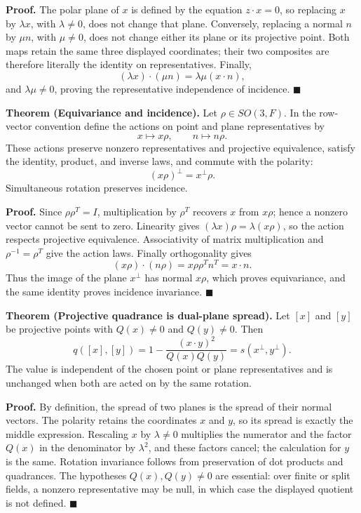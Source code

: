 \documentclass[11pt]{article}
\begin{document}
\smallskip
\noindent\textbf{Proof.}
The polar plane of \(x\) is defined by the equation
\(z\mathbin{\cdot}x=0\), so replacing \(x\) by
\(\lambda x\), with \(\lambda\ne0\), does not change that plane.
Conversely, replacing a normal \(n\) by \(\mu n\), with \(\mu\ne0\), does
not change either its plane or its projective point.  Both maps retain the
same three displayed coordinates; their two composites are therefore
literally the identity on representatives.  Finally,
\[
 (\lambda x)\mathbin{\cdot}(\mu n)
   =\lambda\mu(x\mathbin{\cdot}n),
\]
and \(\lambda\mu\ne0\), proving the representative independence of
incidence. \hfill\(\blacksquare\)

\medskip
\noindent\textbf{Theorem (Equivariance and incidence).}
Let \(\rho\in SO(3,F)\).  In the row-vector convention define the actions on
point and plane representatives by
\[
 x\longmapsto x\rho,\qquad n\longmapsto n\rho.
\]
These actions preserve nonzero representatives and projective equivalence,
satisfy the identity, product, and inverse laws, and commute with the
polarity:
\[
 (x\rho)^\perp=x^\perp\rho.
\]
Simultaneous rotation preserves incidence.

\smallskip
\noindent\textbf{Proof.}
Since \(\rho\rho^T=I\), multiplication by \(\rho^T\) recovers \(x\) from
\(x\rho\); hence a nonzero vector cannot be sent to zero.  Linearity gives
\((\lambda x)\rho=\lambda(x\rho)\), so the action respects projective
equivalence.  Associativity of matrix multiplication and
\(\rho^{-1}=\rho^T\) give the action laws.  Finally orthogonality gives
\[
 (x\rho)\mathbin{\cdot}(n\rho)
 =x\rho\rho^Tn^T
 =x\mathbin{\cdot}n.
\]
Thus the image of the plane \(x^\perp\) has normal \(x\rho\), which proves
equivariance, and the same identity proves incidence invariance.
\hfill\(\blacksquare\)

\medskip
\noindent\textbf{Theorem (Projective quadrance is dual-plane spread).}
Let \([x]\) and \([y]\) be projective points with
\(Q(x)\ne0\) and \(Q(y)\ne0\).  Then
\[
 q([x],[y])
 =1-\frac{(x\mathbin{\cdot}y)^2}{Q(x)Q(y)}
 =s(x^\perp,y^\perp).
\]
The value is independent of the chosen point or plane representatives and is
unchanged when both are acted on by the same rotation.

\smallskip
\noindent\textbf{Proof.}
By definition, the spread of two planes is the spread of their normal
vectors.  The polarity retains the coordinates \(x\) and \(y\), so its spread
is exactly the middle expression.  Rescaling \(x\) by \(\lambda\ne0\)
multiplies the numerator and the factor \(Q(x)\) in the denominator by
\(\lambda^2\), and these factors cancel; the calculation for \(y\) is the
same.  Rotation invariance follows from preservation of dot products and
quadrances.  The hypotheses \(Q(x),Q(y)\ne0\) are essential: over finite or
split fields, a nonzero representative may be null, in which case the
displayed quotient is not defined. \hfill\(\blacksquare\)
\end{document}
